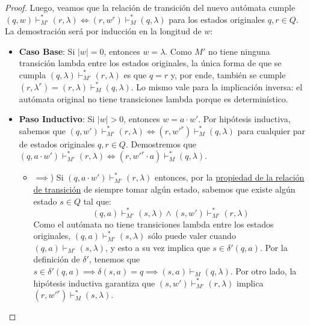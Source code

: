 \begin{proof}
    Luego, veamos que la relación de transición del nuevo autómata cumple $(q, w) \vdash_{M'}^* (r, \lambda) \iff (r, w^r) \vdash_M^* (q, \lambda)$ para los estados originales $q, r \in Q$. La demostración será por inducción en la longitud de $w$:
    \begin{itemize}
        \item \textbf{Caso Base}: Si $|w| = 0$, entonces $w = \lambda$. Como $M'$ no tiene ninguna transición lambda entre los estados originales, la única forma de que se cumpla $(q, \lambda) \vdash_{M'}^* (r, \lambda)$ es que $q = r$ y, por ende, también se cumple $(r, \lambda^r) = (r, \lambda) \vdash_M^* (q, \lambda)$. Lo mismo vale para la implicación inversa: el autómata original no tiene transiciones lambda porque es determinístico.
        \item \textbf{Paso Inductivo}: Si $|w| > 0$, entonces $w = a \cdot w'$. Por hipótesis inductiva, sabemos que $(q, w') \vdash_{M'}^* (r, \lambda) \iff (r, w'^r) \vdash_M^* (q, \lambda)$ para cualquier par de estados originales $q, r \in Q$. Demostremos que $(q, a \cdot w') \vdash_{M'}^* (r, \lambda) \iff (r, w'^r \cdot a) \vdash_M^* (q, \lambda)$.
              \begin{itemize}
                  \item $\implies$) Si $(q, a \cdot w') \vdash_{M'}^* (r, \lambda)$ entonces, por la \hyperref[subsubsec-propiedades-rel-transicion]{propiedad de la relación de transición} de siempre tomar algún estado, sabemos que existe algún estado $s \in Q$ tal que:
                        $$
                            (q, a) \vdash_{M'}^* (s, \lambda) \land (s, w') \vdash_{M'}^* (r, \lambda)
                        $$
                        Como el autómata no tiene transiciones lambda entre los estados originales, $(q, a) \vdash_{M'}^* (s, \lambda)$ sólo puede valer cuando $(q, a) \vdash_{M'} (s, \lambda)$, y esto a su vez implica que $s \in \delta'(q, a)$. Por la definición de $\delta'$, tenemos que $s \in \delta'(q, a) \implies \delta(s, a) = q \implies (s, a) \vdash_M (q, \lambda)$. Por otro lado, la hipótesis inductiva garantiza que $(s, w') \vdash_{M'}^* (r, \lambda)$ implica $(r, w'^r) \vdash_M^* (s, \lambda)$.


\end{itemize}
\end{itemize}
\end{proof}
